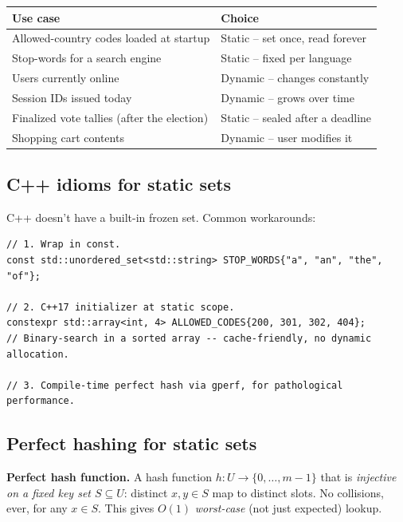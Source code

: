 \documentclass[11pt]{article}
\begin{document}
\begin{center}
\begin{tabular}{ll}
\hline
Use case & Choice \\
\hline
Allowed-country codes loaded at startup & Static -- set once, read forever \\
Stop-words for a search engine & Static -- fixed per language \\
Users currently online & Dynamic -- changes constantly \\
Session IDs issued today & Dynamic -- grows over time \\
Finalized vote tallies (after the election) & Static -- sealed after a deadline \\
Shopping cart contents & Dynamic -- user modifies it \\
\hline
\end{tabular}
\end{center}

\subsection*{C++ idioms for static sets}

C++ doesn't have a built-in frozen set. Common workarounds:

\begin{lstlisting}[basicstyle=\ttfamily\small,frame=single]
// 1. Wrap in const.
const std::unordered_set<std::string> STOP_WORDS{"a", "an", "the", "of"};

// 2. C++17 initializer at static scope.
constexpr std::array<int, 4> ALLOWED_CODES{200, 301, 302, 404};
// Binary-search in a sorted array -- cache-friendly, no dynamic allocation.

// 3. Compile-time perfect hash via gperf, for pathological performance.
\end{lstlisting}

\subsection*{Perfect hashing for static sets}

\begin{defnbox}
\textbf{Perfect hash function.} A hash function $h : U \to
\{0, \ldots, m-1\}$ that is \emph{injective on a fixed key set $S
\subseteq U$}: distinct $x, y \in S$ map to distinct slots. No
collisions, ever, for any $x \in S$. This gives $O(1)$
\emph{worst-case} (not just expected) lookup.
\end{defnbox}
\end{document}
